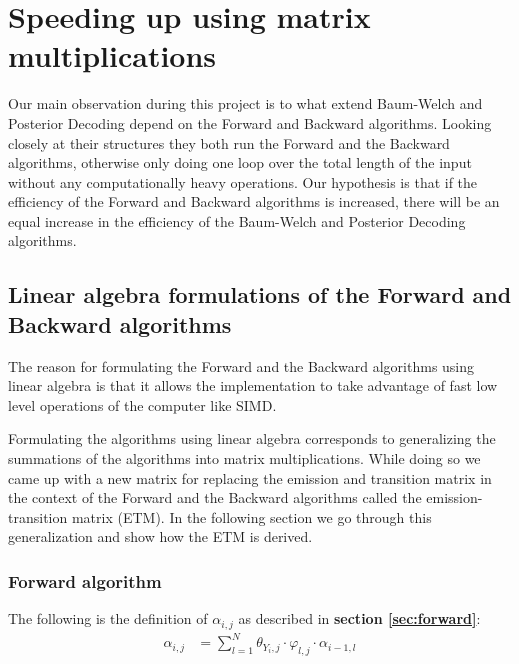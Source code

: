 \section{Speeding up using matrix multiplications}\label{sec:ForwardBackward}

Our main observation during this project is to what extend Baum-Welch and Posterior Decoding depend on the Forward and Backward algorithms. Looking closely at their structures they both run the Forward and the Backward algorithms, otherwise only doing one loop over the total length of the input without any computationally heavy operations. Our hypothesis is that if the efficiency of the Forward and Backward algorithms is increased, there will be an equal increase in the efficiency of the Baum-Welch and Posterior Decoding algorithms.

\subsection{Linear algebra formulations of the Forward and Backward algorithms}
The reason for formulating the Forward and the Backward algorithms using linear algebra is that it allows the implementation to take advantage of fast low level operations of the computer like SIMD.

Formulating the algorithms using linear algebra corresponds to generalizing the summations of the algorithms into matrix multiplications. While doing so we came up with a new matrix for replacing the emission and transition matrix in the context of the Forward and the Backward algorithms called the emission-transition matrix (ETM). In the following section we go through this generalization and show how the ETM is derived.

\subsubsection{Forward algorithm}
The following is the definition of $\alpha_{i,j}$ as described in \textbf{section \ref{sec:forward}}:
\begin{align}\label{forward:summation}
  \alpha_{i,j} &= \sum\limits_{l=1}^{N} \theta_{Y_i,j}\cdot\varphi_{l,j}\cdot\alpha_{i-1,l}
\end{align}

